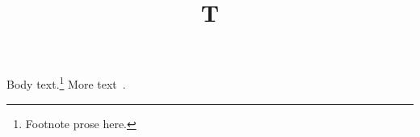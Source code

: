 \documentclass[aps,prl]{revtex4-1}
\begin{document}
\title{T}\maketitle
Body text.\footnote{Footnote prose here.} More text~\cite{Ref1}.

\end{document}
